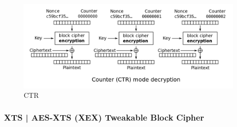 
\textsf{\small }

\begin{figure}[H]
	\centering
	\includegraphics[width=1\textwidth, height=1\textheight, keepaspectratio]{./images/aes_modes/ctr.png}
	\caption{CTR}
	\label{fig:ctr}
\end{figure}

\subsubsection{XTS | AES-XTS (XEX) Tweakable Block Cipher}






